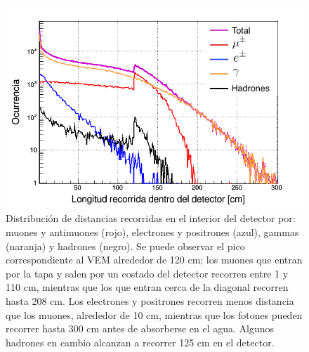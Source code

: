 \documentclass[12pt,oneside,openany,letter]{book}
\begin{document}
\begin{figure}[h]
\centering
\includegraphics[scale=0.4]{track_flujo.png}
\caption[Distribuci\'on de distancias recorridas en el interior del detector por el flujo de partículas secundarias a nivel de la base del Cerro Machín]{Distribuci\'on de distancias recorridas en el interior del detector por: muones y antimuones (rojo), electrones y positrones (azul), gammas (naranja) y hadrones (negro). Se puede observar el pico correspondiente al VEM alrededor de 120 cm; los muones que entran por la tapa y salen por un costado del detector recorren entre 1 y 110 cm, mientras que los que entran cerca de la diagonal recorren hasta 208 cm. Los electrones y positrones recorren menos distancia que los muones, alrededor de 10 cm, mientras que los fotones pueden recorrer hasta 300 cm antes de absorberse en el agua. Algunos hadrones en cambio alcanzan a recorrer 125 cm en el detector.
\label{track_flujo} }
\end{figure}
\end{document}
